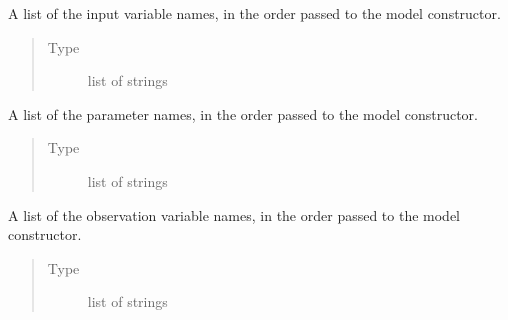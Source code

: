 \documentclass[letterpaper,10pt,english,openany,oneside]{sphinxmanual}
\begin{document}
\begin{fulllineitems}
\begin{fulllineitems}
\begin{quote}
\begin{description}
\end{description}\end{quote}

\end{fulllineitems}


\begin{fulllineitems}
\label{\detokenize{nloed:nloed.model.Model.input_name_list}}
A list of the input variable names, in the order passed
to the model constructor.
\begin{quote}\begin{description}
\item[{Type}] \leavevmode
list of strings

\end{description}\end{quote}

\end{fulllineitems}


\begin{fulllineitems}
\label{\detokenize{nloed:nloed.model.Model.param_name_list}}
A list of the parameter names, in the order passed
to the model constructor.
\begin{quote}\begin{description}
\item[{Type}] \leavevmode
list of strings

\end{description}\end{quote}

\end{fulllineitems}


\begin{fulllineitems}
\label{\detokenize{nloed:nloed.model.Model.observ_name_list}}
A list of the observation variable names, in the order
passed to the model constructor.
\begin{quote}\begin{description}
\item[{Type}] \leavevmode
list of strings


\end{description}
\end{quote}
\end{fulllineitems}
\end{fulllineitems}
\end{document}
